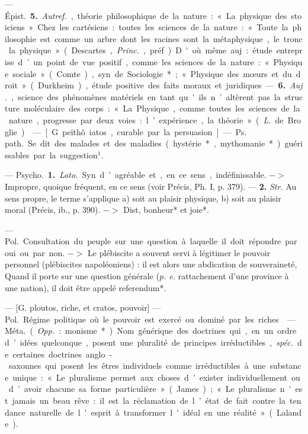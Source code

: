 \begin{itemize}[leftmargin=1cm, label=, itemsep=1pt]
 — \si{Épist.} {\bf 5.}
{\it Autref.}, théorie philosophique de la
nature : « La physique des stoiciens ». Chez les cartésiens : toutes
les sciences de la nature : « Toute la
philosophie est comme un arbre
dont les racines sont la métaphysique, le tronc la physique » (Descartes, {\it Princ.}, préf.). D'où même
auj. : étude entreprise d’un point de
vue positif, comme les sciences de
la nature : « Physique sociale »
(Comte), syn. de Sociologie* ; « Physique des mœurs et du droit » (Durkheim), étude positive des faits moraux et juridiques. — {\bf 6.} {\it Auj.},
science des phénomènes matériels en
tant qu'ils n’altèrent pas la structure moléculaire des corps : « La
Physique, comme toutes les sciences
de la nature, progresse par deux
voies : l’expérience, la théorie »
({\it L.} de Broglie).

 — [G. peïthô iatos, curable
par la persuasion] — \si{Ps. path.} Se
dit des malades et des maladies
(hystérie*, mythomanie*) guérissables par la suggestion$^1$.

 — \si{Psycho.} {\bf 1.} {\it Lato.} Syn.
d’agréable et, en ce sens, indéfinissable. $->$ Impropre, quoique fréquent, en ce sens (voir Précis, Ph. I,
p. 379). — {\bf 2.} {\it Str.} Au sens propre,
le terme s'applique a) soit au
plaisir physique, b) soit au plaisir
moral (Précis, ib., p. 390). $->$ Dist,
bonheur* et joie*.

 — \si{Pol.} Consultation du
peuple sur une question à laquelle
il doit répondre par oui ou par non.
$->$ Le plébiscite a souvent servi à
légitimer le pouvoir personnel (plébiscites napoléoniens) : il est alors
une abdication de souveraineté,
Quand il porte sur une question
générale ({\it p. e.} rattachement d'une
province à une nation), il doit être
appelé referendum*.

 — [G. ploutos, riche, et
cratos, pouvoir] — \si{Pol.} Régime politique où le pouvoir est exercé ou
dominé par les riches.

 — \si{Méta.} ({\it Opp.} : monisme*).
Nom générique des doctrines qui,
en un ordre d’idées quelconque,
posent une pluralité de principes
irréductibles, {\it spéc.} de certaines doctrines anglo-saxonnes qui posent
les êtres individuels comme irréductibles à une substance unique :
« Le pluralisme permet aux choses
d’exister individuellement ou d’avoir
chacune sa forme particulière »
(James) ; « Le pluralisme n'est
jamais un beau rêve : il est la réclamation de l’état de fait contre la
tendance naturelle de l'esprit à
transformer l'idéal en une réalité »
(Lalande).


\end{itemize}
